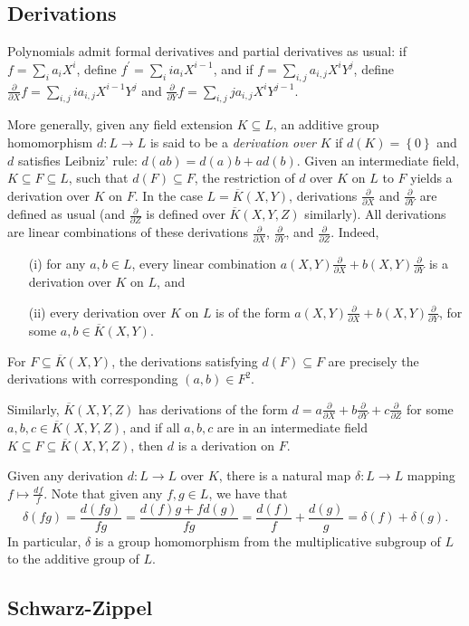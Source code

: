 \documentclass[11pt,letterpaper]{article}
\newcommand{\dX}{\frac{\partial}{\partial X}}
\newcommand{\dY}{\frac{\partial}{\partial Y}}
\newcommand{\dZ}{\frac{\partial}{\partial Z}}
\theoremstyle{definition}
\newcommand{\6}{\mathbf}
\newcommand{\7}{\mathcal}
\begin{document}
\subsection{Derivations}

Polynomials admit formal derivatives and partial derivatives as usual: if $f = \sum_i a_i X^i$, define $f^\prime = \sum_i i a_i X^{i-1}$, and if $f = \sum_{i,j} a_{i,j}X^i Y^j$, define $\dX f = \sum_{i,j} ia_{i,j}X^{i-1} Y^j$ and $\dY f = \sum_{i,j} ja_{i,j}X^iY^{j-1}$.

More generally, given any field extension $K \subseteq L$, an additive group homomorphism $d: L \to L$ is said to be a \textit{derivation over} $K$ if $d(K) = \left\{0\right\}$ and $d$ satisfies Leibniz' rule: $d(ab) = d(a)b + ad(b)$. Given an intermediate field, $K \subseteq F \subseteq L$, such that $d(F) \subseteq F$, the restriction of $d$ over $K$ on $L$ to $F$ yields a derivation over $K$ on $F$.  In the case $L=\overline{K}(X,Y)$, derivations $\dX$ and $\dY$ are defined as usual (and $\dZ$ is defined over $\overline{K}(X,Y,Z)$ similarly).
All derivations are linear combinations of these derivations $\dX$, $\dY$, and $\dZ$. Indeed, 
\begin{itemize}
    \item[(i)] for any $a, b \in L$, every linear combination $a(X,Y) \dX + b(X,Y) \dY$ is a derivation over $K$ on $L$, and 
    \item[(ii)] every derivation over $K$ on $L$ is of the form $a(X,Y) \dX + b(X,Y) \dY$, for some $a, b \in \overline{K}(X,Y)$. 
\end{itemize}
For $F \subseteq \overline{K}(X,Y)$, the  derivations satisfying $d(F) \subseteq F$ are precisely the derivations with corresponding $(a, b) \in F^2$.

Similarly, $\overline{K}(X,Y,Z)$ has derivations of the form $d=a\dX + b\dY + c\dZ$ for some $a, b, c \in \overline{K}(X,Y,Z)$, and if all $a, b, c$ are in an intermediate field $K \subseteq F \subseteq \overline{K}(X,Y,Z)$, then $d$ is a derivation on $F$.

Given any derivation $d:L \to L$ over $K$, there is a natural map $\delta:L \to L$ mapping $f \mapsto \frac{df}{f}$. Note that given any $f, g \in L$, we have that 
$$ \delta(fg) = \frac{d(fg)}{fg} = \frac{d(f)g + fd(g)}{fg} = \frac{d(f)}{f} + \frac{d(g)}{g} = \delta(f) + \delta(g).$$
In particular, $\delta$ is a group homomorphism from the multiplicative subgroup of $L$ to the additive group of $L$.


\subsection{Schwarz-Zippel}
\end{document}
